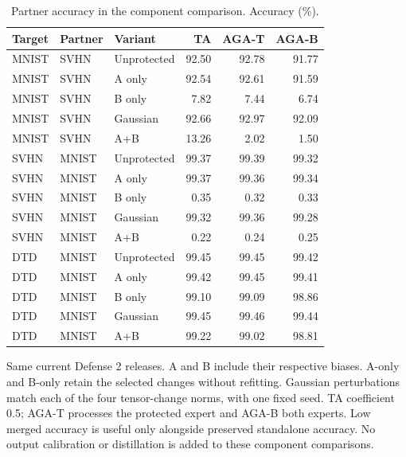 \begin{table}[t]
\centering\small
\setlength{\tabcolsep}{4pt}
\caption{Partner accuracy in the component comparison. Accuracy (\%).}
\label{tab:defense2_component_partners}
\begin{tabular}{@{}lllrrr@{}}
\toprule
Target & Partner & Variant & TA & AGA-T & AGA-B \\
\midrule
MNIST & SVHN & Unprotected & 92.50 & 92.78 & 91.77 \\
MNIST & SVHN & A only & 92.54 & 92.61 & 91.59 \\
MNIST & SVHN & B only & 7.82 & 7.44 & 6.74 \\
MNIST & SVHN & Gaussian & 92.66 & 92.97 & 92.09 \\
MNIST & SVHN & A+B & 13.26 & 2.02 & 1.50 \\
\midrule
SVHN & MNIST & Unprotected & 99.37 & 99.39 & 99.32 \\
SVHN & MNIST & A only & 99.37 & 99.36 & 99.34 \\
SVHN & MNIST & B only & 0.35 & 0.32 & 0.33 \\
SVHN & MNIST & Gaussian & 99.32 & 99.36 & 99.28 \\
SVHN & MNIST & A+B & 0.22 & 0.24 & 0.25 \\
\midrule
DTD & MNIST & Unprotected & 99.45 & 99.45 & 99.42 \\
DTD & MNIST & A only & 99.42 & 99.45 & 99.41 \\
DTD & MNIST & B only & 99.10 & 99.09 & 98.86 \\
DTD & MNIST & Gaussian & 99.45 & 99.46 & 99.44 \\
DTD & MNIST & A+B & 99.22 & 99.02 & 98.81 \\
\bottomrule
\end{tabular}
\par\smallskip
\begin{minipage}{\textwidth}\footnotesize Same current Defense 2 releases. A and B include their respective biases. A-only and B-only retain the selected changes without refitting. Gaussian perturbations match each of the four tensor-change norms, with one fixed seed. TA coefficient 0.5; AGA-T processes the protected expert and AGA-B both experts. Low merged accuracy is useful only alongside preserved standalone accuracy. No output calibration or distillation is added to these component comparisons.\end{minipage}
\end{table}
